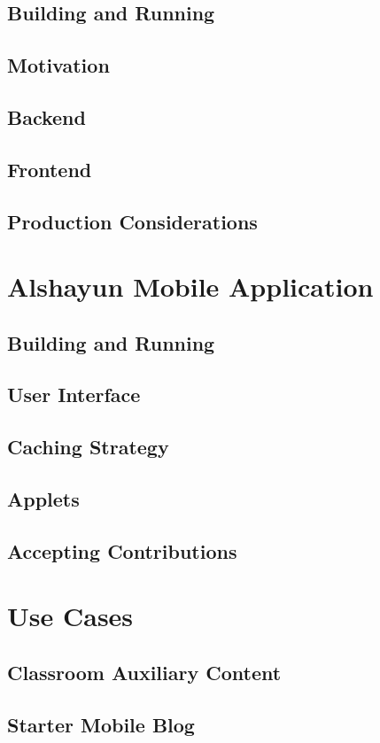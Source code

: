 \documentclass[12pt]{report}
\begin{document}
\section{Building and Running}
\section{Motivation}
\section{Backend}
\section{Frontend}
\section{Production Considerations}

\chapter{Alshayun Mobile Application}
\section{Building and Running}
\section{User Interface}
\section{Caching Strategy}
\section{Applets}
\section{Accepting Contributions}

\chapter{Use Cases}
\section{Classroom Auxiliary Content}
\section{Starter Mobile Blog}
\end{document}
